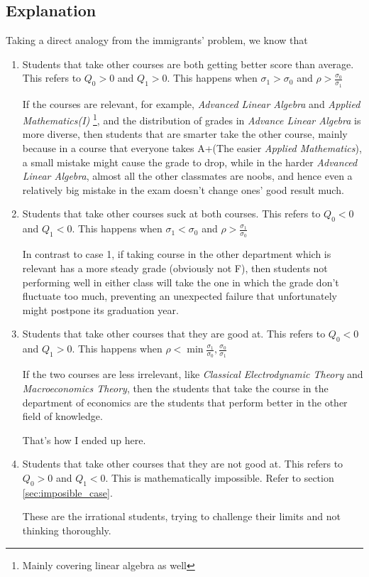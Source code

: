 \subsection{Explanation}
Taking a direct analogy from the immigrants' problem, we know that 
\begin{enumerate}[label = Case \arabic{enumi}.]
    \item Students that take other courses are both getting better score than average.
    This refers to $Q_0>0$ and $Q_1>0$.
    This happens when $\sigma_1 > \sigma_0$ and $\rho>\frac{\sigma_0}{\sigma_1}$

    If the courses are relevant, for example, \emph{Advanced Linear Algebra} and \emph{Applied Mathematics(I)}
    \footnote{Mainly covering linear algebra as well}, and the distribution of grades in \emph{Advance Linear Algebra} is more 
    diverse, then students that are smarter take the other course, mainly because in a course that everyone takes A+(The easier \emph{Applied Mathematics}), 
    a small mistake might cause the grade to drop, while in the harder \emph{Advanced Linear Algebra}, almost all the 
    other classmates are noobs, and hence even a relatively big mistake in the exam doesn't change ones' good result much.

    \item Students that take other courses suck at both courses.
    This refers to $Q_0<0$ and $Q_1<0$.
    This happens when $\sigma_1 < \sigma_0$ and $\rho>\frac{\sigma_1}{\sigma_0}$

    In contrast to case 1, if taking course in the other department which is relevant has a more steady grade 
    (obviously not F), then students not performing well in either class will take the one in which the grade don't 
    fluctuate too much, preventing an unexpected failure that unfortunately might postpone its graduation year.

    \item Students that take other courses that they are good at.
    This refers to $Q_0<0$ and $Q_1>0$.
    This happens when $\rho<\min{\frac{\sigma_1}{\sigma_0},\frac{\sigma_0}{\sigma_1} }$

    If the two courses are less irrelevant, like \emph{Classical Electrodynamic Theory} and 
    \emph{Macroeconomics Theory}, then the students that take the course in the department of economics
    are the students that perform better in the other field of knowledge. 

    That's how I ended up here.

    \item Students that take other courses that they are not good at.
    This refers to $Q_0>0$ and $Q_1<0$. 
    This is mathematically impossible. Refer to section \ref{sec:imposible_case}.

    These are the irrational students, trying to challenge their limits and not thinking thoroughly.


\end{enumerate}
